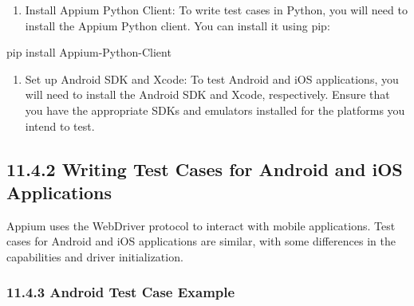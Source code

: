 \documentclass[
  paper=a4,
  ,captions=tableheading
]{scrartcl}
\newenvironment{Shaded}{}{}
\newcommand{\ExtensionTok}[1]{#1}
\newcommand{\NormalTok}[1]{#1}
\providecommand{\tightlist}{%
  \setlength{\itemsep}{0pt}\setlength{\parskip}{0pt}}
\begin{document}
\begin{enumerate}
\def\labelenumi{\arabic{enumi}.}
\setcounter{enumi}{1}
\tightlist
\item
  Install Appium Python Client: To write test cases in Python, you will
  need to install the Appium Python client. You can install it using
  pip:
\end{enumerate}

\begin{Shaded}
\begin{Highlighting}[]
\ExtensionTok{pip}\NormalTok{ install Appium{-}Python{-}Client}
\end{Highlighting}
\end{Shaded}

\begin{enumerate}
\def\labelenumi{\arabic{enumi}.}
\setcounter{enumi}{2}
\tightlist
\item
  Set up Android SDK and Xcode: To test Android and iOS applications,
  you will need to install the Android SDK and Xcode, respectively.
  Ensure that you have the appropriate SDKs and emulators installed for
  the platforms you intend to test.
\end{enumerate}

\hypertarget{writing-test-cases-for-android-and-ios-applications}{%
\subsection{11.4.2 Writing Test Cases for Android and iOS
Applications}\label{writing-test-cases-for-android-and-ios-applications}}

Appium uses the WebDriver protocol to interact with mobile applications.
Test cases for Android and iOS applications are similar, with some
differences in the capabilities and driver initialization.

\hypertarget{android-test-case-example}{%
\subsubsection{11.4.3 Android Test Case
Example}\label{android-test-case-example}}
\end{document}
